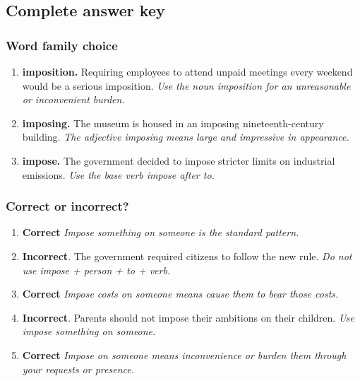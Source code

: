 \documentclass[11pt]{article}
\begin{document}
\subsection{Complete answer key}
\subsubsection{Word family choice}
\begin{enumerate}
  \item \textbf{imposition.} Requiring employees to attend unpaid meetings every weekend would be a serious imposition. \emph{Use the noun imposition for an unreasonable or inconvenient burden.}
  \item \textbf{imposing.} The museum is housed in an imposing nineteenth-century building. \emph{The adjective imposing means large and impressive in appearance.}
  \item \textbf{impose.} The government decided to impose stricter limits on industrial emissions. \emph{Use the base verb impose after to.}
\end{enumerate}

\subsubsection{Correct or incorrect?}
\begin{enumerate}
  \item \textbf{Correct} \emph{Impose something on someone is the standard pattern.}
  \item \textbf{Incorrect}. The government required citizens to follow the new rule. \emph{Do not use impose + person + to + verb.}
  \item \textbf{Correct} \emph{Impose costs on someone means cause them to bear those costs.}
  \item \textbf{Incorrect}. Parents should not impose their ambitions on their children. \emph{Use impose something on someone.}
  \item \textbf{Correct} \emph{Impose on someone means inconvenience or burden them through your requests or presence.}
\end{enumerate}
\end{document}
